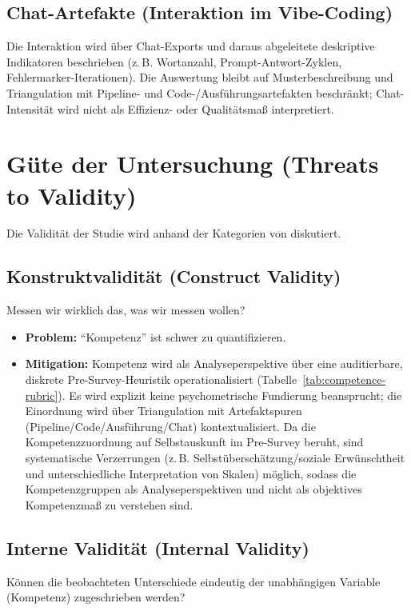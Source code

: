 \subsection{Chat-Artefakte (Interaktion im Vibe-Coding)}
Die Interaktion wird über Chat-Exports und daraus abgeleitete deskriptive Indikatoren beschrieben (z.\,B. Wortanzahl, Prompt-Antwort-Zyklen, Fehlermarker-Iterationen). Die Auswertung bleibt auf Musterbeschreibung und Triangulation mit Pipeline- und Code-/Ausführungsartefakten beschränkt; Chat-Intensität wird nicht als Effizienz- oder Qualitätsmaß interpretiert.

\section{Güte der Untersuchung (Threats to Validity)}
Die Validität der Studie wird anhand der Kategorien von \textcite{cook1979quasi} diskutiert.

\subsection{Konstruktvalidität (Construct Validity)}
Messen wir wirklich das, was wir messen wollen?

\begin{itemize}
  \item {\bfseries Problem:} \enquote{Kompetenz} ist schwer zu quantifizieren.
  \item {\bfseries Mitigation:} Kompetenz wird als Analyseperspektive über eine auditierbare, diskrete Pre-Survey-Heuristik operationalisiert (Tabelle~\ref{tab:competence-rubric}). Es wird explizit keine psychometrische Fundierung beansprucht; die Einordnung wird über Triangulation mit Artefaktspuren (Pipeline/Code/Ausführung/Chat) kontextualisiert. Da die Kompetenzzuordnung auf Selbstauskunft im Pre-Survey beruht, sind systematische Verzerrungen (z.\,B. Selbstüberschätzung/soziale Erwünschtheit und unterschiedliche Interpretation von Skalen) möglich, sodass die Kompetenzgruppen als Analyseperspektiven und nicht als objektives Kompetenzmaß zu verstehen sind.
\end{itemize}

\subsection{Interne Validität (Internal Validity)}
Können die beobachteten Unterschiede eindeutig der unabhängigen Variable (Kompetenz) zugeschrieben werden?

